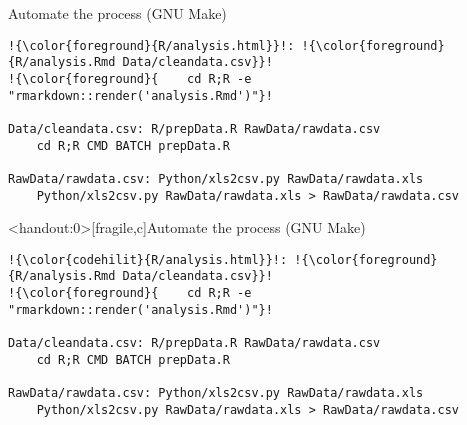 \documentclass[aspectratio=169,12pt,t]{beamer}
\begin{document}
\begin{frame}[fragile,c]{Automate the process (GNU Make)}

\begin{center}
\begin{minipage}[c]{13.8cm}
\begin{semiverbatim}
\lstset{basicstyle=\footnotesize}
\begin{lstlisting}[escapechar=!,linewidth=13.8cm]
!{\color{foreground}{R/analysis.html}}!: !{\color{foreground}{R/analysis.Rmd Data/cleandata.csv}}!
!{\color{foreground}{    cd R;R -e "rmarkdown::render('analysis.Rmd')"}!

Data/cleandata.csv: R/prepData.R RawData/rawdata.csv
    cd R;R CMD BATCH prepData.R

RawData/rawdata.csv: Python/xls2csv.py RawData/rawdata.xls
    Python/xls2csv.py RawData/rawdata.xls > RawData/rawdata.csv
\end{lstlisting}
\end{semiverbatim}
\end{minipage}
\end{center}

\end{frame}



\begin{frame}<handout:0>[fragile,c]{Automate the process (GNU Make)}

\addtocounter{framenumber}{-1}

\begin{center}
\begin{minipage}[c]{13.8cm}
\begin{semiverbatim}
\lstset{basicstyle=\footnotesize}
\begin{lstlisting}[escapechar=!,linewidth=13.8cm]
!{\color{codehilit}{R/analysis.html}}!: !{\color{foreground}{R/analysis.Rmd Data/cleandata.csv}}!
!{\color{foreground}{    cd R;R -e "rmarkdown::render('analysis.Rmd')"}!

Data/cleandata.csv: R/prepData.R RawData/rawdata.csv
    cd R;R CMD BATCH prepData.R

RawData/rawdata.csv: Python/xls2csv.py RawData/rawdata.xls
    Python/xls2csv.py RawData/rawdata.xls > RawData/rawdata.csv
\end{lstlisting}
\end{semiverbatim}
\end{minipage}
\end{center}

\end{frame}
\end{document}
